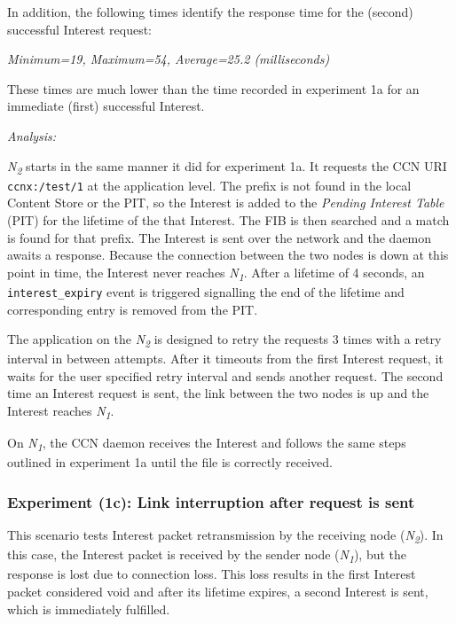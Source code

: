 \documentclass[a4paper,12pt]{report}      %
\begin{document}
In addition, the following times identify the response time for the (second) successful Interest request:
\begin{center}\textsl{Minimum=19, Maximum=54, Average=25.2 (milliseconds)}\end{center}
These times are much lower than the time recorded in experiment 1a for an immediate (first) successful
Interest.

\vspace*{1\baselineskip}\noindent\emph{Analysis:}

 \emph{N\textsubscript{2}} starts in the same manner it did for experiment 1a. It requests the CCN URI
\verb!ccnx:/test/1! at the application level. The prefix is not found in the local Content Store or the PIT, so
the Interest is added to the \textsl{Pending Interest Table} (PIT) for the lifetime of the that Interest. 
The FIB is then searched and a match is found for that prefix. The Interest is sent over the network and
the daemon awaits a response. Because the connection between the two nodes is down at this point in
time, the Interest never reaches  \emph{N\textsubscript{1}}. After a lifetime of 4 seconds, an \verb!interest_expiry!
 event is triggered signalling the end of the lifetime and corresponding entry is removed from the PIT.

The application on the  \emph{N\textsubscript{2}} is designed to retry the requests 3 times with a retry interval in
between attempts. After it timeouts from the first Interest request, it waits for the user specified retry
interval and sends another request. The second time an Interest request is sent, the link between the two
nodes is up and the Interest reaches \emph{N\textsubscript{1}}.

On \emph{N\textsubscript{1}}, the CCN daemon receives the Interest and follows the same steps outlined in
experiment 1a until the file is correctly received.

\subsubsection{Experiment (1c): Link interruption after request is sent}

This scenario tests Interest packet retransmission by the receiving node (\emph{N\textsubscript{2}}). In this case, the Interest packet
is received by the sender node (\emph{N\textsubscript{1}}), but the response is lost due to connection loss. This loss results in the
first Interest packet considered void and after its lifetime expires, a second Interest is sent, which is immediately fulfilled.
\end{document}
